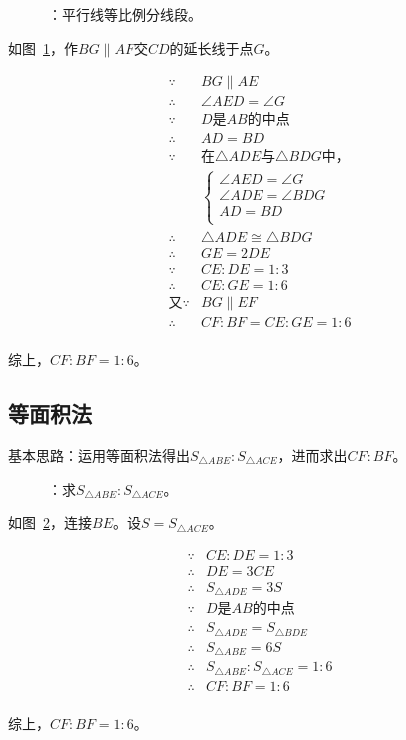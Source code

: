 \begin{figure}[htbp]
  \centering
  \caption{：平行线等比例分线段。}
  \label{fig:006F-parB}
\end{figure}

如图~\ref{fig:006F-parB}，作$BG \parallel AF$交$CD$的延长线于点$G$。

\begin{align*}
  \because  {}& BG \parallel AE \\
  \therefore{}& \angle AED = \angle G \\
  \because  {}& D\text{是}AB\text{的中点} \\
  \therefore{}& AD = BD \\
  \because  {}& \text{在}\triangle ADE\text{与}\triangle BDG\text{中，} \\
  & \begin{cases}
    \angle AED = \angle G \\
    \angle ADE = \angle BDG \\
    AD = BD \\
  \end{cases} \\
  \therefore{}& \triangle ADE \cong \triangle BDG \\
  \therefore{}& GE = 2DE \\
  \because  {}& CE:DE = 1:3 \\
  \therefore{}& CE:GE = 1:6 \\
  \text{又}\because{}& BG \parallel EF \\
  \therefore{}& CF:BF = CE:GE = 1:6 \\
\end{align*}

综上，$CF:BF = 1:6$。

\subsection{等面积法} \label{subsec:006F-S}

基本思路：运用等面积法得出$S_{\triangle ABE}:S_{\triangle ACE}$，进而求出$CF:BF$。

\begin{figure}[htbp]
  \centering
  \caption{：求$S_{\triangle ABE}:S_{\triangle ACE}$。}
  \label{fig:006F-S}
\end{figure}

如图~\ref{fig:006F-S}，连接$BE$。设$S = S_{\triangle ACE}$。

\begin{align*}
  \because  {}& CE:DE = 1:3 \\
  \therefore{}& DE = 3CE \\
  \therefore{}& S_{\triangle ADE} = 3S \\
  \because  {}& D\text{是}AB\text{的中点} \\
  \therefore{}& S_{\triangle ADE} = S_{\triangle BDE} \\
  \therefore{}& S_{\triangle ABE} = 6S \\
  \therefore{}& S_{\triangle ABE}:S_{\triangle ACE} = 1:6 \\
  \therefore{}& CF:BF = 1:6 \\
\end{align*}

综上，$CF:BF = 1:6$。
